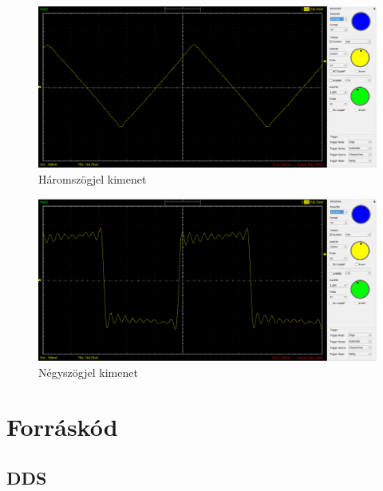 \documentclass[a4paper,11pt]{article}
\begin{document}
\begin{figure}[h!]
	\begin{center}
		\includegraphics[scale=0.25]{scope_tri.png}	
	\end{center}
	\caption{Háromszögjel kimenet}
	\label{a:triout}
\end{figure}

\begin{figure}[h!]
	\begin{center}
		\includegraphics[scale=0.25]{scope_sqr.png}	
	\end{center}
	\caption{Négyszögjel kimenet}
	\label{a:sqrout}
\end{figure}

\section{Forráskód}

\subsection{DDS}


\end{document}
